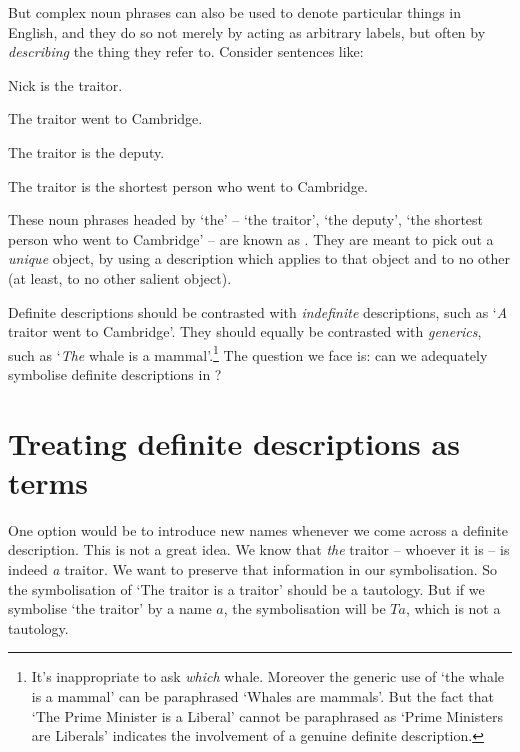 But complex noun phrases can also be used to denote particular things in English, and they do so not merely by acting as arbitrary labels, but often by \emph{describing} the thing they refer to. Consider sentences like:
	\begin{earg}
		\item[\ex{traitor1}] Nick is the traitor.
		\item[\ex{traitor2}] The traitor went to Cambridge.
		\item[\ex{traitor3}] The traitor is the deputy.
		\item[\ex{traitor4}] The traitor is the shortest person who went to Cambridge.
	\end{earg}
These noun phrases headed by `the' – `the traitor', `the deputy', `the shortest person who went to Cambridge' – are known as . They are meant to pick out a \emph{unique} object, by using a description which applies to that object and to no other (at least, to no other salient object).  

Definite descriptions should be contrasted with \emph{indefinite} descriptions, such as `\emph{A} traitor went to Cambridge'. They should equally be contrasted with \emph{generics}, such as `\emph{The} whale is a mammal'.\footnote{It's inappropriate to ask \emph{which} whale. Moreover the generic use of `the whale is a mammal' can be paraphrased `Whales are mammals'. But the fact that `The Prime Minister is a Liberal' cannot be paraphrased as `Prime Ministers are Liberals' indicates the involvement of a genuine definite description.} The question we face is: can we adequately symbolise definite descriptions in \FOL?


\section{Treating definite descriptions as terms}
One option would be to introduce new names whenever we come across a definite description. This is not a great idea. We know that \emph{the} traitor – whoever it is – is indeed \emph{a} traitor. We want to preserve that information in our symbolisation. So the symbolisation of `The traitor is a traitor' should be a tautology. But if we symbolise `the traitor' by a name $a$, the symbolisation will be $Ta$, which is not a tautology.

